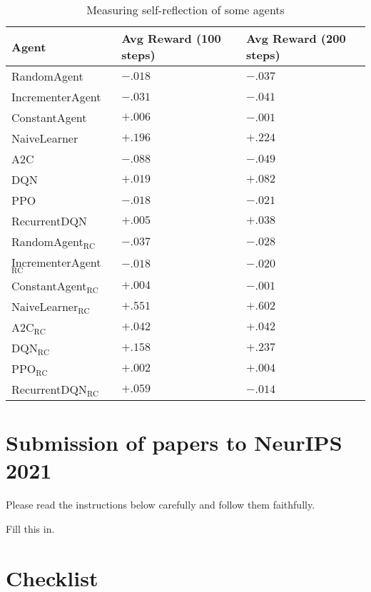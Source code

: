 \documentclass{article}
\def\RC{\textrm{RC}}
\begin{document}
\begin{table}
  \caption{Measuring self-reflection of some agents}
  \centering
  \begin{tabular}{lll}
    \toprule
    Agent     & Avg Reward (100 steps)     & Avg Reward (200 steps)\\
    \midrule
    RandomAgent & $-.018$ & $-.037$\\
    IncrementerAgent & $-.031$ & $-.041$\\
    ConstantAgent & $+.006$ & $-.001$\\
    NaiveLearner & $+.196$ & $+.224$\\
    A2C & $-.088$ & $-.049$\\
    DQN & $+.019$ & $+.082$\\
    PPO & $-.018$ & $-.021$\\
    RecurrentDQN & $+.005$ & $+.038$\\
    RandomAgent${}_{\RC}$ & $-.037$ & $-.028$\\
    IncrementerAgent${}_{\RC}$ & $-.018$ & $-.020$\\
    ConstantAgent${}_{\RC}$ & $+.004$ & $-.001$\\
    NaiveLearner${}_{\RC}$ & $+.551$ & $+.602$\\
    A2C${}_{\RC}$ & $+.042$ & $+.042$\\
    DQN${}_{\RC}$ & $+.158$ & $+.237$\\
    PPO${}_{\RC}$ & $+.002$ & $+.004$\\
    RecurrentDQN${}_{\RC}$ & $+.059$ & $-.014$\\
    \bottomrule
  \end{tabular}
\end{table}



\section{Submission of papers to NeurIPS 2021}

Please read the instructions below carefully and follow them faithfully.


\begin{ack}
Fill this in.
\end{ack}





\section*{Checklist}
\end{document}
